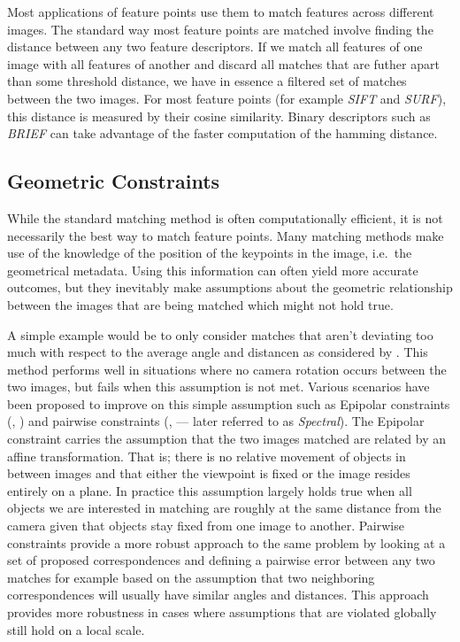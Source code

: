 Most applications of feature points use them to match features across 
different images. The standard way most feature points are matched 
involve finding the distance between any two feature descriptors. If we 
match all features of one image with all features of another and discard 
all matches that are futher apart than some threshold distance, we have 
in essence a filtered set of matches between the two images. For most 
feature points (for example \emph{SIFT} and \emph{SURF}), this distance 
is measured by their cosine similarity. Binary descriptors such
as \emph{BRIEF} can take advantage of the faster computation of the 
hamming distance.

\subsection{Geometric Constraints}

While the standard matching method is often computationally efficient, 
it is not necessarily the best way to match feature points. Many 
matching methods make use of the knowledge of the position of the 
keypoints in the image, i.e.\ the geometrical metadata. Using this 
information can often yield more accurate outcomes, but they inevitably 
make assumptions
about the geometric relationship between the images that are being 
matched which might not hold true.  

A simple example would be to only consider matches that aren't deviating 
too much with respect to the average angle and distancen as considered 
by \cite{kim2008efficient}.  This method performs well in situations 
where no camera rotation occurs between the two images, but fails when 
this assumption is not met. Various scenarios have been proposed to 
improve on this simple assumption such as Epipolar constraints 
(\cite{torr2000mlesac}, \cite{chum2005matching}) and pairwise 
constraints (\cite{choi2009robust}, \cite{leordeanu2005spectral} --- 
later referred to as \emph{Spectral}).  The Epipolar constraint carries 
the assumption that the two images matched are related by an affine 
transformation.  That is; there is no relative movement of objects in 
between images and that either the viewpoint is fixed or the image 
resides entirely on a plane.  In practice this assumption largely holds 
true when all objects we are interested in matching are roughly at the 
same distance from the camera given that objects stay fixed from one 
image to another.  Pairwise constraints provide a more robust approach 
to the same problem by looking at a set of proposed correspondences and 
defining a pairwise error between any two matches for example based on 
the assumption that two neighboring correspondences will usually have 
similar angles and distances. This approach provides more robustness in 
cases where assumptions that are violated globally still hold on a local 
scale.

